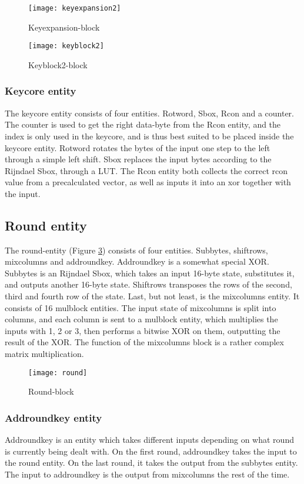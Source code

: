 \begin{figure}[h!]
  \centering
  \texttt{[image: keyexpansion2]}
  \caption{Keyexpansion-block}
  \label{block:keyexpansion}
\end{figure}

\begin{figure}[h!]
  \centering
  \texttt{[image: keyblock2]}
  \caption{Keyblock2-block}
  \label{block:keyblock2}
\end{figure}

\subsubsection{Keycore entity}
The keycore entity consists of four entities. Rotword, Sbox, Rcon and a 
counter. The counter is used to get the right data-byte from the Rcon 
entity, and the index is only used in the keycore, and is thus best 
suited to be placed inside the keycore entity. Rotword rotates the 
bytes of the input one step to the left through a simple left shift. 
Sbox replaces the input bytes according to the Rijndael Sbox, through 
a LUT. The Rcon entity both collects the correct rcon value from a 
precalculated vector, as well as inputs it into an xor together with 
the input.

\subsection{Round entity}
The round-entity (Figure \ref{block:round}) consists of four entities. 
Subbytes, shiftrows, mixcolumns and addroundkey. Addroundkey is a 
somewhat special XOR. Subbytes is an Rijndael Sbox, which takes an 
input 16-byte state, substitutes it, and outputs another 16-byte state. 
Shiftrows transposes the rows of the second, third and fourth row of 
the state. Last, but not least, is the mixcolumns entity. It consists 
of 16 mulblock entities. The input state of mixcolumns is split into 
columns, and each column is sent to a mulblock entity, which multiplies 
the inputs with 1, 2 or 3, then performs a bitwise XOR on them, 
outputting the result of the XOR. The function of the mixcolumns block 
is a rather complex matrix multiplication.

\begin{figure}[h!]
  \centering
  \texttt{[image: round]}
  \caption{Round-block}
  \label{block:round}
\end{figure}

\subsubsection{Addroundkey entity}
Addroundkey is an entity which takes different inputs depending on 
what round is currently being dealt with. On the first round, 
addroundkey takes the input to the round entity. On the last round, it 
takes the output from the subbytes entity. The input to addroundkey is 
the output from mixcolumns the rest of the time.


